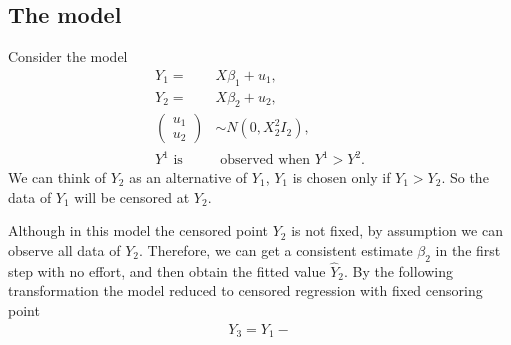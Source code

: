 \documentclass[12pt]{article}
\theoremstyle{plain} \newtheorem{theorem}{Theorem}
\theoremstyle{definition} \newtheorem{definition}{Definition}
\begin{document}
\subsection{The model}
Consider the model
\begin{align*}
  Y_1 = & X\beta_1 +u_1, \\
  Y_2 = & X\beta_2 +u_2, \\
  \left( \begin{array}{c} u_1 \\ u_2 \end{array} \right)& \sim  N(0,X_2^2I_2), \\
  Y^1 \mbox{ is}& \mbox{ observed when } Y^1> Y^2.
\end{align*}
We can think of $Y_2$ as an alternative of $Y_1$, $Y_1$ is chosen only if $Y_1>Y_2$. So the data of $Y_1$ will be censored at $Y_2$.

Although in this model the censored point $Y_2$ is not fixed, by assumption we can observe all data of $Y_2$. Therefore, we can get a consistent estimate $\beta_2$ in the first step with no effort, and then obtain the fitted value $\hat{Y}_2$. By the following transformation the model reduced to censored regression with fixed censoring point
\begin{align*}
  Y_3 = Y_1 - 
\end{align*}
\end{document}

